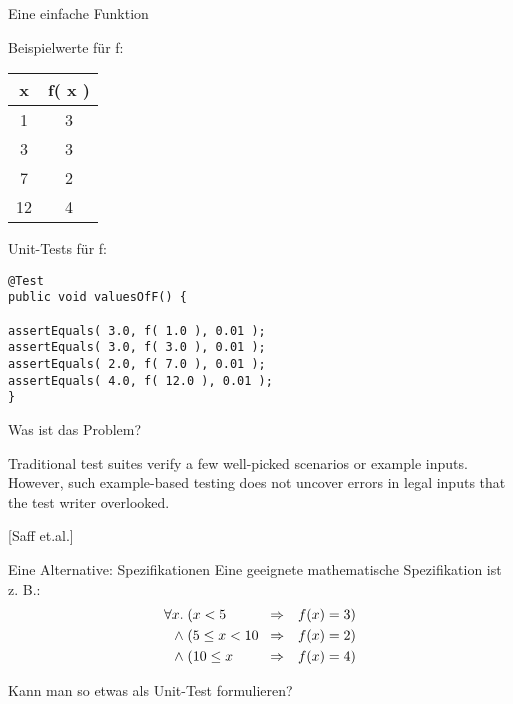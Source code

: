 \begin{frame}{Eine einfache Funktion}

\begin{minipage}[t]{5cm}
Beispielwerte für f:

\begin{tabular}{|c|c|}
\textbf{x} & \textbf{f( x )}  \\ \hline
1 & 3  \\
3 & 3  \\
7 & 2  \\
12 & 4
\end{tabular} 
\end{minipage}
\begin{minipage}[t]{5cm}
Unit-Tests für  f:

\begin{lstlisting}
@Test
public void valuesOfF() {

assertEquals( 3.0, f( 1.0 ), 0.01 );
assertEquals( 3.0, f( 3.0 ), 0.01 );
assertEquals( 2.0, f( 7.0 ), 0.01 );
assertEquals( 4.0, f( 12.0 ), 0.01 );
}
\end{lstlisting}
\end{minipage}
\end{frame}

\begin{frame}{Was ist das Problem?}

\glqq{}Traditional test suites verify a few well-picked scenarios or example inputs. However, such example-based testing does not uncover errors in legal inputs that the test writer overlooked.\grqq{}

\hfill[Saff et.al.]

\end{frame}

\begin{frame}{Eine Alternative: Spezifikationen}
Eine geeignete mathematische Spezifikation ist z. B.:
\begin{eqnarray*}
\forall x. \; \parbox{2cm}{$(x < 5$} &\Rightarrow& f(x) = 3) \\
\land \; \parbox{2cm}{$(5 \leq x < 10$} &\Rightarrow& f(x) = 2)\\
\land \; \parbox{2cm}{$(10 \leq x$} &\Rightarrow& f(x) = 4)
\end{eqnarray*}

Kann man so etwas als Unit-Test formulieren?
\end{frame}

